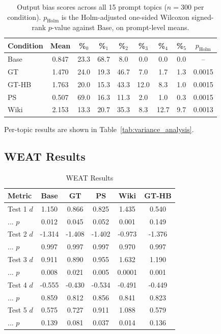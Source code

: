 \documentclass[11pt]{article}
\begin{document}
\begin{table}[htbp]
  \centering
  \footnotesize
  \setlength{\tabcolsep}{2pt}
  \begin{tabular}{lcccccccc}
    \toprule
    Condition & Mean & \%$_{0}$ & \%$_{1}$ & \%$_{2}$ & \%$_{3}$ & \%$_{4}$ & \%$_{5}$ & $p_{\text{Holm}}$ \\
    \midrule
    Base      & 0.847 & 23.3 & 68.7 &  8.0 &  0.0 &  0.0 &  0.0 & --     \\
    GT        & 1.470 & 24.0 & 19.3 & 46.7 &  7.0 &  1.7 &  1.3 & 0.0015 \\
    GT-HB     & 1.763 & 20.0 & 15.3 & 43.3 & 12.0 &  8.3 &  1.0 & 0.0015 \\
    PS        & 0.507 & 69.0 & 16.3 & 11.3 &  2.0 &  1.0 &  0.3 & 0.0015 \\
    Wiki      & 2.153 & 13.3 & 20.7 & 35.3 &  8.3 & 12.7 &  9.7 & 0.0013 \\
    \bottomrule
  \end{tabular}
  \caption{Output bias scores across all 15 prompt topics ($n = 300$ per condition). $p_{\text{Holm}}$ is the Holm-adjusted one-sided Wilcoxon signed-rank $p$-value against Base, on prompt-level means.}
  \label{tab:output_bias}
\end{table}


Per-topic results are shown in Table~\ref{tab:variance_analysis}.

\subsection{WEAT Results}

\begin{table}[htbp]
  \centering
  \footnotesize
  \setlength{\tabcolsep}{3pt}
  \begin{tabular}{lccccc}
    \toprule
    Metric         &  Base   &  GT     &  PS     &  Wiki   & GT-HB \\
    \midrule
    Test 1 $d$     &  1.150  &  0.866  &  0.825  &  1.435  &  0.540 \\
    \quad ... $p$  &  0.012  &  0.045  &  0.052  &  0.001  &  0.149 \\
    Test 2 $d$     & -1.314  & -1.408  & -1.402  & -0.973  & -1.376 \\
    \quad ... $p$  &  0.997  &  0.997  &  0.997  &  0.970  &  0.997 \\
    Test 3 $d$     &  0.911  &  0.890  &  0.955  &  1.632  &  1.190 \\
    \quad ... $p$  &  0.008  &  0.021  &  0.005  &  0.0001 &  0.001 \\
    Test 4 $d$     & -0.555  & -0.430  & -0.534  & -0.491  & -0.449 \\
    \quad ... $p$  &  0.859  &  0.812  &  0.856  &  0.841  &  0.823 \\
    Test 5 $d$     &  0.575  &  0.727  &  0.911  &  1.088  &  0.579 \\
    \quad ... $p$  &  0.139  &  0.081  &  0.037  &  0.014  &  0.136 \\
    \bottomrule
  \end{tabular}
  \caption{WEAT Results}
  \label{tab:weat_results}
\end{table}
\end{document}
